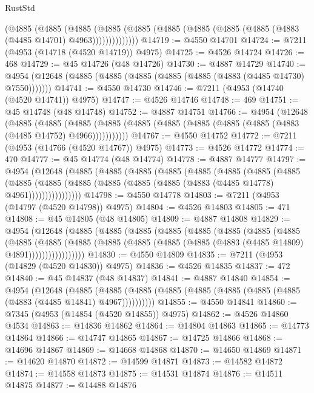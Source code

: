 \begin{lexlean}{RustStd}
\begin{coremodule}
            (@4885
              (@4885
                (@4885
                  (@4885
                    (@4885 (@4885 (@4885 (@4885 (@4885 (@4883 (@4485 @14701) @4963))))))))))))))
@14719 := @4550 @14701
@14724 := @7211 (@4953 (@14718 (@4520 @14719)) @4975)
@14725 := @4526 @14724
@14726 := 468
@14729 := @45 @14726 (@48 @14726)
@14730 := @4887 @14729
@14740 := @4954 (@12648 (@4885 (@4885 (@4885 (@4885 (@4885 (@4883 (@4485 @14730) @7550)))))))
@14741 := @4550 @14730
@14746 := @7211 (@4953 (@14740 (@4520 @14741)) @4975)
@14747 := @4526 @14746
@14748 := 469
@14751 := @45 @14748 (@48 @14748)
@14752 := @4887 @14751
@14766 := @4954
    (@12648
      (@4885
        (@4885
          (@4885 (@4885 (@4885 (@4885 (@4885 (@4885 (@4885 (@4883 (@4485 @14752) @4966)))))))))))
@14767 := @4550 @14752
@14772 := @7211 (@4953 (@14766 (@4520 @14767)) @4975)
@14773 := @4526 @14772
@14774 := 470
@14777 := @45 @14774 (@48 @14774)
@14778 := @4887 @14777
@14797 := @4954
    (@12648
      (@4885
        (@4885
          (@4885
            (@4885
              (@4885
                (@4885
                  (@4885
                    (@4885
                      (@4885
                        (@4885
                          (@4885 (@4885 (@4885 (@4885 (@4883 (@4485 @14778) @4961))))))))))))))))
@14798 := @4550 @14778
@14803 := @7211 (@4953 (@14797 (@4520 @14798)) @4975)
@14804 := @4526 @14803
@14805 := 471
@14808 := @45 @14805 (@48 @14805)
@14809 := @4887 @14808
@14829 := @4954
    (@12648
      (@4885
        (@4885
          (@4885
            (@4885
              (@4885
                (@4885
                  (@4885
                    (@4885
                      (@4885
                        (@4885
                          (@4885
                            (@4885 (@4885 (@4885 (@4885 (@4883 (@4485 @14809) @4891)))))))))))))))))
@14830 := @4550 @14809
@14835 := @7211 (@4953 (@14829 (@4520 @14830)) @4975)
@14836 := @4526 @14835
@14837 := 472
@14840 := @45 @14837 (@48 @14837)
@14841 := @4887 @14840
@14854 := @4954
    (@12648
      (@4885 (@4885 (@4885 (@4885 (@4885 (@4885 (@4885 (@4885 (@4883 (@4485 @14841) @4967))))))))))
@14855 := @4550 @14841
@14860 := @7345 (@4953 (@14854 (@4520 @14855)) @4975)
@14862 := @4526 @14860 @4534
@14863 := @14836 @14862
@14864 := @14804 @14863
@14865 := @14773 @14864
@14866 := @14747 @14865
@14867 := @14725 @14866
@14868 := @14696 @14867
@14869 := @14668 @14868
@14870 := @14650 @14869
@14871 := @14620 @14870
@14872 := @14599 @14871
@14873 := @14582 @14872
@14874 := @14558 @14873
@14875 := @14531 @14874
@14876 := @14511 @14875
@14877 := @14488 @14876

\end{coremodule}
\end{lexlean}
